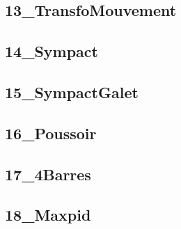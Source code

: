 \subsection{13\_TransfoMouvement}
\graphicspath{{../11-Actions Mécaniques/TD/TEC/TEC-05/13_TransfoMouvement/images/}{../11-Actions Mécaniques/TD/TEC/TEC-05/13_TransfoMouvement/}{../Style/png/}}


\subsection{14\_Sympact}
\graphicspath{{../11-Actions Mécaniques/TD/TEC/TEC-05/14_Sympact/images/}{../11-Actions Mécaniques/TD/TEC/TEC-05/14_Sympact/}{../Style/png/}}


\subsection{15\_SympactGalet}
\graphicspath{{../11-Actions Mécaniques/TD/TEC/TEC-05/15_SympactGalet/images/}{../11-Actions Mécaniques/TD/TEC/TEC-05/15_SympactGalet/}{../Style/png/}}


\subsection{16\_Poussoir}
\graphicspath{{../11-Actions Mécaniques/TD/TEC/TEC-05/16_Poussoir/images/}{../11-Actions Mécaniques/TD/TEC/TEC-05/16_Poussoir/}{../Style/png/}}


\subsection{17\_4Barres}
\graphicspath{{../11-Actions Mécaniques/TD/TEC/TEC-05/17_4Barres/images/}{../11-Actions Mécaniques/TD/TEC/TEC-05/17_4Barres/}{../Style/png/}}


\subsection{18\_Maxpid}
\graphicspath{{../11-Actions Mécaniques/TD/TEC/TEC-05/18_Maxpid/images/}{../11-Actions Mécaniques/TD/TEC/TEC-05/18_Maxpid/}{../Style/png/}}


